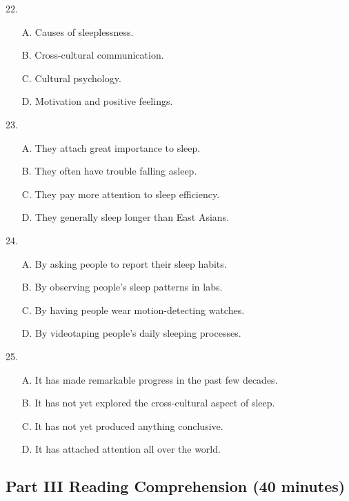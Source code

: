 \documentclass[UTF8,11pt]{ctexart}
\begin{document}
22.


\begin{itemize}[leftmargin=2em,itemsep=.2em,topsep=.4em]\item[A.] Causes of sleeplessness.
\item[B.] Cross-cultural communication.
\item[C.] Cultural psychology.
\item[D.] Motivation and positive feelings.
\end{itemize}

23.


\begin{itemize}[leftmargin=2em,itemsep=.2em,topsep=.4em]\item[A.] They attach great importance to sleep.
\item[B.] They often have trouble falling asleep.
\item[C.] They pay more attention to sleep efficiency.
\item[D.] They generally sleep longer than East Asians.
\end{itemize}

24.


\begin{itemize}[leftmargin=2em,itemsep=.2em,topsep=.4em]\item[A.] By asking people to report their sleep habits.
\item[B.] By observing people’s sleep patterns in labs.
\item[C.] By having people wear motion-detecting watches.
\item[D.] By videotaping people’s daily sleeping processes.
\end{itemize}

25.


\begin{itemize}[leftmargin=2em,itemsep=.2em,topsep=.4em]\item[A.] It has made remarkable progress in the past few decades.
\item[B.] It has not yet explored the cross-cultural aspect of sleep.
\item[C.] It has not yet produced anything conclusive.
\item[D.] It has attached attention all over the world.
\end{itemize}

\subsection*{\textbf{Part} III \textbf{Reading Comprehension} \textbf{(40 minutes)}}
\end{document}
